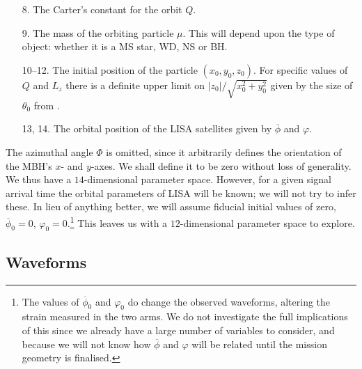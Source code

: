 \begin{enumerate}[leftmargin=*, widest=\:88--88.]
\item[8.] The Carter's constant for the orbit $Q$.
\item[9.] The mass of the orbiting particle $\mu$. This will depend upon the type of object: whether it is a MS star, WD, NS or BH.
\item[10--12.] The initial position of the particle $(x_0, y_0, z_0)$. For specific values of $Q$ and $L_z$ there is a definite upper limit on $|z_0|/\sqrt{x_0^2+y_0^2}$ given by the size of $\theta_0$ from .
\item[13, 14.] The orbital position of the LISA satellites given by $\overline{\phi}$ and $\varphi$.\\
\end{enumerate}%
The azimuthal angle $\Phi$ is omitted, since it arbitrarily defines the orientation of the MBH's $x$- and $y$-axes. We shall define it to be zero without loss of generality. We thus have a $14$-dimensional parameter space. However, for a given signal arrival time the orbital parameters of LISA will be known; we will not try to infer these. In lieu of anything better, we will assume fiducial initial values of zero, $\overline{\phi}_0 = 0$, $\varphi_0 = 0$.\footnote{The values of $\overline{\phi}_0$ and $\varphi_0$ do change the observed waveforms, altering the strain measured in the two arms. We do not investigate the full implications of this since we already have a large number of variables to consider, and because we will not know how $\overline{\phi}$ and $\varphi$ will be related until the mission geometry is finalised.} This leaves us with a $12$-dimensional parameter space to explore.

\subsection{Waveforms}

